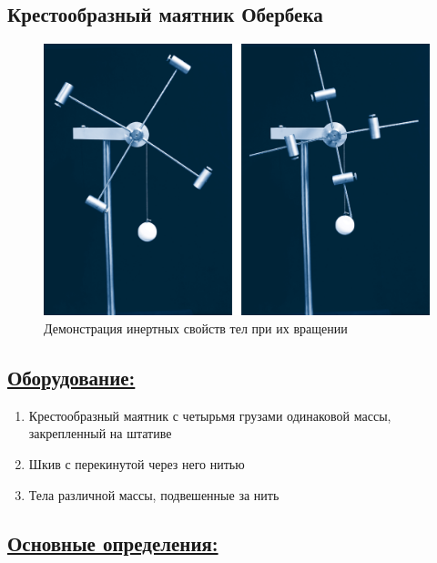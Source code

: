 \documentclass[14pt,a4paper,oneside]{extarticle}	%
\begin{document}
	
	\begin{center}
		\subsection*{Крестообразный маятник Обербека}
	\end{center}
	
	\begin{figure}[H] 	
		\centering 	
		\includegraphics[width=0.9\linewidth]{oberbeck-1.png}
		\caption{Демонстрация инертных свойств тел при их вращении}
		\label{oberbeck-1}
	\end{figure}
	
	\subsection*{\underline{Оборудование:}}
	
	\begin{enumerate} 
		\item Крестообразный маятник с четырьмя грузами одинаковой массы, закрепленный на штативе
		\item Шкив с перекинутой через него нитью
		\item Тела различной массы, подвешенные за нить
	\end{enumerate}

	\newpage
	\subsection*{\underline{Основные определения:}}
	
\end{document}
